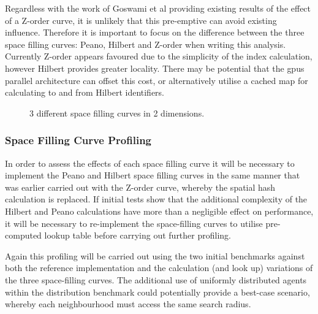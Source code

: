         Regardless with the work of Goswami et al providing existing results of the effect of a Z-order curve, it is unlikely that this pre-emptive can avoid existing influence. Therefore it is important to focus on the difference between the three space filling curves: Peano, Hilbert and Z-order when writing this analysis. Currently Z-order appears favoured due to the simplicity of the index calculation, however Hilbert provides greater locality. There may be potential that the \glspl{gpu} parallel architecture can offset this cost, or alternatively utilise a cached map for calculating to and from Hilbert identifiers.
        
\begin{figure}[h]
  \begin{centering}
  \par\end{centering}
  \protect\caption{\label{fig:space-filling-curve}3 different space filling curves in 2 dimensions.}
\end{figure}
        
      \subsubsection*{Space Filling Curve Profiling}
        In order to assess the effects of each space filling curve it will be necessary to implement the Peano and Hilbert space filling curves in the same manner that was earlier carried out with the Z-order curve, whereby the spatial hash calculation is replaced. If initial tests show that the additional complexity of the Hilbert and Peano calculations have more than a negligible effect on performance, it will be necessary to re-implement the space-filling curves to utilise pre-computed lookup table before carrying out further profiling.
        
        Again this profiling will be carried out using the two initial benchmarks against both the reference implementation and the calculation (and look up) variations of the three space-filling curves. The additional use of uniformly distributed agents within the distribution benchmark could potentially provide a best-case scenario, whereby each neighbourhood must access the same search radius.
        
